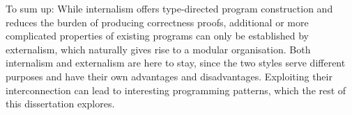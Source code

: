 To sum up:
While internalism offers type-directed program construction and reduces the burden of producing correctness proofs, additional or more complicated properties of existing programs can only be established by externalism, which naturally gives rise to a modular organisation.
Both internalism and externalism are here to stay, since the two styles serve different purposes and have their own advantages and disadvantages.
Exploiting their interconnection can lead to interesting programming patterns, which the rest of this dissertation explores.